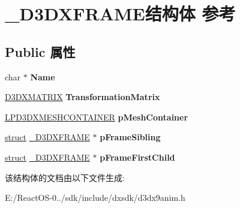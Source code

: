 \hypertarget{struct___d3_d_x_f_r_a_m_e}{}\section{\+\_\+\+D3\+D\+X\+F\+R\+A\+M\+E结构体 参考}
\label{struct___d3_d_x_f_r_a_m_e}
\subsection*{Public 属性}
\begin{DoxyCompactItemize}
\item 
\mbox{\label{struct___d3_d_x_f_r_a_m_e_a2f3493c026840e3065386d14e7d79bf5}} 
char $\ast$ {\bfseries Name}
\item 
\mbox{\label{struct___d3_d_x_f_r_a_m_e_aa3ef12078c77c9c0a3d5da34b185d87b}} 
\hyperlink{struct___d3_d_m_a_t_r_i_x}{D3\+D\+X\+M\+A\+T\+R\+IX} {\bfseries Transformation\+Matrix}
\item 
\mbox{\label{struct___d3_d_x_f_r_a_m_e_aaf0e1c2e4749f6ec4ed35294cdbc2494}} 
\hyperlink{struct___d3_d_x_m_e_s_h_c_o_n_t_a_i_n_e_r}{L\+P\+D3\+D\+X\+M\+E\+S\+H\+C\+O\+N\+T\+A\+I\+N\+ER} {\bfseries p\+Mesh\+Container}
\item 
\mbox{\label{struct___d3_d_x_f_r_a_m_e_ae8bd42822fc3897f6be27df60d884758}} 
\hyperlink{interfacestruct}{struct} \hyperlink{struct___d3_d_x_f_r_a_m_e}{\+\_\+\+D3\+D\+X\+F\+R\+A\+ME} $\ast$ {\bfseries p\+Frame\+Sibling}
\item 
\mbox{\label{struct___d3_d_x_f_r_a_m_e_a0eb37f054ccdb2d20b415217778ae414}} 
\hyperlink{interfacestruct}{struct} \hyperlink{struct___d3_d_x_f_r_a_m_e}{\+\_\+\+D3\+D\+X\+F\+R\+A\+ME} $\ast$ {\bfseries p\+Frame\+First\+Child}
\end{DoxyCompactItemize}


该结构体的文档由以下文件生成\+:\begin{DoxyCompactItemize}
\item 
E\+:/\+React\+O\+S-\/0../sdk/include/dxsdk/d3dx9anim.\+h\end{DoxyCompactItemize}
